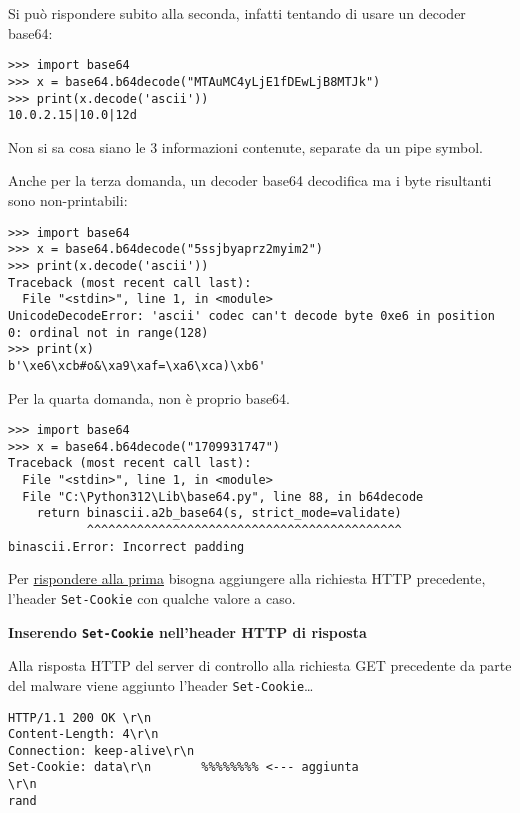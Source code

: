 \documentclass[
    a4paper, %
    11pt %
]{article}
\begin{document}
            Si può rispondere subito alla seconda, infatti tentando di usare un decoder base64:

            \begin{lstlisting}
>>> import base64
>>> x = base64.b64decode("MTAuMC4yLjE1fDEwLjB8MTJk")
>>> print(x.decode('ascii'))
10.0.2.15|10.0|12d
            \end{lstlisting}
            
            Non si sa cosa siano le 3 informazioni contenute, separate da un pipe symbol.

            Anche per la terza domanda, un decoder base64 decodifica ma i byte risultanti sono non-printabili:

            \begin{lstlisting}
>>> import base64
>>> x = base64.b64decode("5ssjbyaprz2myim2")
>>> print(x.decode('ascii'))
Traceback (most recent call last):
  File "<stdin>", line 1, in <module>
UnicodeDecodeError: 'ascii' codec can't decode byte 0xe6 in position 0: ordinal not in range(128)
>>> print(x)
b'\xe6\xcb#o&\xa9\xaf=\xa6\xca)\xb6'
            \end{lstlisting}

            Per la quarta domanda, non è proprio base64.
            \begin{lstlisting}
>>> import base64
>>> x = base64.b64decode("1709931747")
Traceback (most recent call last):
  File "<stdin>", line 1, in <module>
  File "C:\Python312\Lib\base64.py", line 88, in b64decode
    return binascii.a2b_base64(s, strict_mode=validate)
           ^^^^^^^^^^^^^^^^^^^^^^^^^^^^^^^^^^^^^^^^^^^^
binascii.Error: Incorrect padding
            \end{lstlisting}
            
            Per \underline{rispondere alla prima} bisogna aggiungere alla richiesta HTTP precedente, l'header 
            \texttt{Set-Cookie} con qualche valore a caso.

            \textbf{Inserendo \texttt{Set-Cookie} nell'header HTTP di risposta}

            Alla risposta HTTP del server di controllo alla richiesta GET precedente da parte del malware viene aggiunto l'header \texttt{Set-Cookie}\dots

            \begin{lstlisting}
HTTP/1.1 200 OK \r\n
Content-Length: 4\r\n
Connection: keep-alive\r\n
Set-Cookie: data\r\n       %%%%%%%% <--- aggiunta
\r\n
rand
            \end{lstlisting}
\end{document}
